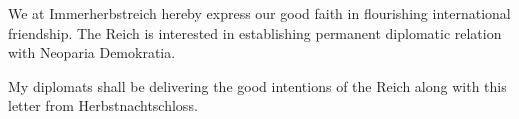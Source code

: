



We at Immerherbstreich hereby express our good faith in flourishing international friendship.
The Reich is interested in establishing permanent diplomatic relation with Neoparia Demokratia.

My diplomats shall be delivering the good intentions of the Reich along with this letter from Herbstnachtschloss.


